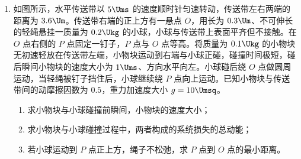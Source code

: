 \documentclass[\gkver]{gaokaozhenti}
\begin{document}
\begin{enumerate}
\begin{enumerate}
	\item
	此过程中容器内气体吸收的热量。
\end{enumerate}

\item
如图所示，水平传送带以 $ 5 \Ums $ 的速度顺时针匀速转动，传送带左右两端的距离为 $ 3.6 \Um $。传送带右端的正上方有一悬点 $ O $，用长为 $ 0.3 \Um $、不可伸长的轻绳悬挂一质量为 $ 0.2 \Ukg $ 的小球，小球与传送带上表面平齐但不接触。在 $ O $ 点右侧的 $ P $ 点固定一钉子，$ P $ 点与 $ O $ 点等高。将质量为 $ 0.1 \Ukg $ 的小物块无初速轻放在传送带左端，小物块运动到右端与小球正碰，碰撞时间极短，碰后瞬间小物块的速度大小为 $ 1 \Ums $、方向水平向左。小球碰后绕 $ O $ 点做圆周运动，当轻绳被钉子挡住后，小球继续绕 $ P $ 点向上运动。已知小物块与传送带间的动摩擦因数为 $ 0.5 $，重力加速度大小 $ g =10 \Umsq $。
\begin{enumerate}
	\item 
	求小物块与小球碰撞前瞬间，小物块的速度大小；
	
	\item
	求小物块与小球碰撞过程中，两者构成的系统损失的总动能；
	
	\item
	若小球运动到 $ P $ 点正上方，绳子不松弛，求 $ P $ 点到 $ O $ 点的最小距离。
\end{enumerate}
\jdanswer{
\begin{enumerate}
	\item 
	$ 5 \Ums $
	

\end{enumerate}}
\end{enumerate}
\end{document}
